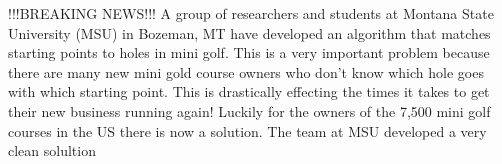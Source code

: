 \documentclass{article}
\begin{document}
	!!!BREAKING NEWS!!! A group of researchers and students at Montana State University (MSU) in Bozeman, MT have developed an algorithm that matches starting points to holes in mini golf. This is a very important problem because there are many new mini gold course owners who don't know which hole goes with which starting point. This is drastically effecting the times it takes to get their new business running again! Luckily for the owners of the 7,500 mini golf courses in the US there is now a solution. The team at MSU developed a very clean solultion 
	
	


\newpage



\end{document}
